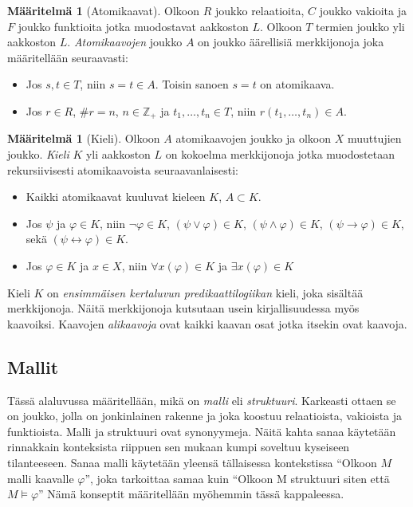 \documentclass[finnish]{tktltiki2}
\theoremstyle{definition}
\newtheorem{maar}[lau]{Määritelmä}
\theoremstyle{remark}
\begin{document}
\begin{maar}[Atomikaavat]
Olkoon $R$ joukko relaatioita, $C$ joukko vakioita ja $F$ joukko funktioita jotka muodostavat aakkoston $L$. Olkoon $T$ termien joukko yli aakkoston $L$. \textit{Atomikaavojen} joukko $A$ on joukko äärellisiä merkkijonoja joka määritellään seuraavasti:
\begin{itemize}
\item Jos $s, t \in T$, niin $s = t \in A$. Toisin sanoen $s = t$ on atomikaava.
\item Jos $r \in R$, $\#r = n$, $n\in \mathbb{Z}_+$ ja $t_1, \ldots, t_n \in T$, niin $r(t_1, \ldots, t_n) \in A$.
\end{itemize}
\end{maar}

\begin{maar}[Kieli]
Olkoon $A$ atomikaavojen joukko ja olkoon $X$ muuttujien joukko. \textit{Kieli} $K$ yli aakkoston $L$ on kokoelma merkkijonoja jotka muodostetaan rekursiivisesti atomikaavoista seuraavanlaisesti:
\begin{itemize}
\item Kaikki atomikaavat kuuluvat kieleen $K$, $A \subset K$.
\item Jos $\psi$ ja $\varphi \in K$, niin $\neg \varphi \in K$, $(\psi \lor \varphi) \in K$, $(\psi \land \varphi) \in K$, $(\psi \to \varphi) \in K$, sekä $(\psi \leftrightarrow \varphi) \in K$.
\item Jos $\varphi \in K$ ja $x \in X$, niin $\forall x(\varphi) \in K$ ja $\exists x(\varphi) \in K$
\end{itemize}
\end{maar}
Kieli $K$ on \textit{ensimmäisen kertaluvun predikaattilogiikan} kieli, joka sisältää merkkijonoja. Näitä merkkijonoja kutsutaan usein kirjallisuudessa myös kaavoiksi. Kaavojen \textit{alikaavoja} ovat kaikki kaavan osat jotka itsekin ovat kaavoja. 

\subsection{Mallit}
Tässä alaluvussa määritellään, mikä on \textit{malli} eli \textit{struktuuri}. Karkeasti ottaen se on joukko, jolla on jonkinlainen rakenne ja joka koostuu relaatioista, vakioista ja funktioista. Malli ja struktuuri ovat synonyymeja. Näitä kahta sanaa käytetään rinnakkain konteksista riippuen sen mukaan kumpi soveltuu kyseiseen tilanteeseen. Sanaa malli käytetään yleensä tällaisessa kontekstissa ``Olkoon $M$ malli kaavalle $\varphi$'', joka tarkoittaa samaa kuin ``Olkoon M struktuuri siten että $M \models \varphi$'' Nämä konseptit määritellään myöhemmin tässä kappaleessa.
\end{document}
